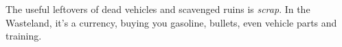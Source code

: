 
The useful leftovers of dead vehicles and scavenged ruins is \emph{scrap}. In the Wasteland, it's a currency, buying you gasoline, bullets, even vehicle parts and training.
